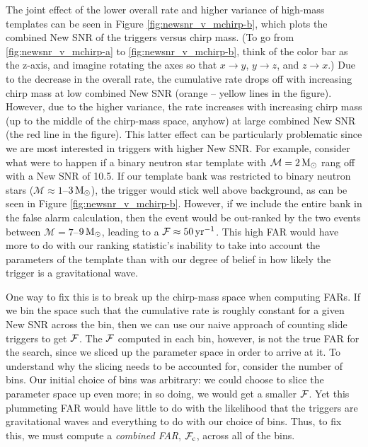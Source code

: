 The joint effect of the lower overall rate and higher variance of high-mass templates can be seen in Figure \ref{fig:newsnr_v_mchirp-b}, which plots the combined New \ac{SNR} of the triggers versus chirp mass. (To go from \ref{fig:newsnr_v_mchirp-a} to \ref{fig:newsnr_v_mchirp-b}, think of the color bar as the z-axis, and imagine rotating the axes so that $x \rightarrow y$, $y \rightarrow z$, and $z \rightarrow x$.) Due to the decrease in the overall rate, the cumulative rate drops off with increasing chirp mass at low combined New \ac{SNR} (orange -- yellow lines in the figure). However, due to the higher variance, the rate increases with increasing chirp mass (up to the middle of the chirp-mass space, anyhow) at large combined New \ac{SNR} (the red line in the figure). This latter effect can be particularly problematic since we are most interested in triggers with higher New \ac{SNR}. For example, consider what were to happen if a binary neutron star template with $\mathcal{M} = 2\,\mathrm{M_\odot}$ rang off with a New \ac{SNR} of 10.5. If our template bank was restricted to binary neutron stars ($\mathcal{M} \approx 1$--$3\,\mathrm{M_\odot}$), the trigger would stick well above background, as can be seen in Figure \ref{fig:newsnr_v_mchirp-b}. However, if we include the entire bank in the false alarm calculation, then the event would be out-ranked by the two events between $\mathcal{M} = 7$--$9\,\mathrm{M_\odot}$, leading to a $\mathcal{F} \approx 50\,\mathrm{yr}^{-1}$. This high \ac{FAR} would have more to do with our ranking statistic's inability to take into account the parameters of the template than with our degree of belief in how likely the trigger is a gravitational wave.

One way to fix this is to break up the chirp-mass space when computing \acp{FAR}. If we bin the space such that the cumulative rate is roughly constant for a given New \ac{SNR} across the bin, then we can use our naive approach of counting slide triggers to get $\mathcal{F}$. The $\mathcal{F}$ computed in each bin, however, is not the true \ac{FAR} for the search, since we sliced up the parameter space in order to arrive at it. To understand why the slicing needs to be accounted for, consider the number of bins. Our initial choice of bins was arbitrary: we could choose to slice the parameter space up even more; in so doing, we would get a smaller $\mathcal{F}$. Yet this plummeting \ac{FAR} would have little to do with the likelihood that the triggers are gravitational waves and everything to do with our choice of bins. Thus, to fix this, we must compute a \emph{combined \ac{FAR}}, $\mathcal{F}_{\mathrm{c}}$, across all of the bins.

